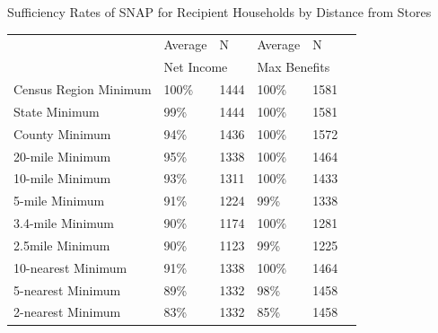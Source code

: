 \documentclass{beamer}
\begin{document}
\begin{frame}

\begin{table}[htbp]{Sufficiency Rates of SNAP for Recipient Households by Distance from Stores}

\begin{adjustbox}{height=1.5in}
  \centering
    \begin{tabular}{llllll}
    \toprule
          & Average  & N     & Average  & N \\

     & \multicolumn{2}{l}{Net Income} & \multicolumn{2}{l}{Max Benefits} \\

    \midrule
    Census Region Minimum & 100\%  & 1444  & 100\%   & 1581 \\
    State Minimum & 99\%   & 1444  & 100\%   & 1581 \\
    County Minimum & 94\%   & 1436  & 100\%   & 1572 \\
    20-mile Minimum & 95\%    & 1338  & 100\%   & 1464 \\
    10-mile Minimum & 93\%    & 1311  & 100\%   & 1433 \\
    5-mile Minimum & 91\%    & 1224  & 99\%    & 1338 \\
    3.4-mile Minimum & 90\%    & 1174  & 100\%   & 1281 \\
    2.5mile Minimum & 90\%    & 1123  & 99\%    & 1225 \\
    10-nearest Minimum & 91\%    & 1338  & 100\%   & 1464 \\
    5-nearest Minimum & 89\%    & 1332  & 98\%    & 1458 \\
    2-nearest Minimum & 83\%    & 1332  & 85\%    & 1458 \\
    \bottomrule
    \end{tabular}
    \end{adjustbox}
	\end{table}

\end{frame}
\end{document}
